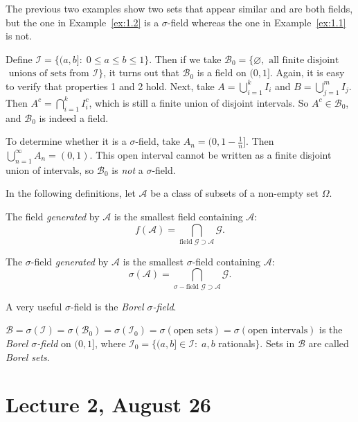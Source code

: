 \documentclass[11pt,fleqn]{book} %
\begin{document}
The previous two examples show two sets that appear similar and are both fields, but the one in Example~\ref{ex:1.2} is a $\sigma$-field whereas the one in Example~\ref{ex:1.1} is not.

\begin{example} \label{ex:1.3}
	Define $\mathcal{I} = \{(a,b]:\;0 \leq a \leq b \leq 1\}$. Then if we take $\mathcal{B}_0 = \{\varnothing, \textrm{ all finite disjoint}$ $\textrm{ unions of sets from } \mathcal{I}\}$, it turns out that $\mathcal{B}_0$ is a field on $(0,1]$. Again, it is easy to verify that properties 1 and 2 hold. Next, take $A = \bigcup_{i=1}^k I_i$ and $B = \bigcup_{j=1}^m I_j$. Then $A^c = \bigcap_{i=1}^k I_i^c$, which is still a finite union of disjoint intervals. So $A^c \in \mathcal{B}_0$, and $\mathcal{B}_0$ is indeed a field.

	To determine whether it is a $\sigma$-field, take $A_n = (0,1-\frac{1}{n}]$. Then $\bigcup_{n=1}^\infty A_n = (0,1)$. This open interval cannot be written as a finite disjoint union of intervals, so $\mathcal{B}_0$ is \emph{not} a $\sigma$-field.
\end{example}

In the following definitions, let $\mathcal{A}$ be a class of subsets of a non-empty set $\Omega$.

\begin{definition} \label{def:1.3}
	The field \emph{generated} by $\mathcal{A}$ is the smallest field containing $\mathcal{A}$:
	\[
		f(\mathcal{A}) = \bigcap_{\textrm{field } \mathcal{G} \supset \mathcal{A}} \mathcal{G}.
	\]

	The $\sigma$-field \emph{generated} by $\mathcal{A}$ is the smallest $\sigma$-field containing $\mathcal{A}$:
	\[
		\sigma(\mathcal{A}) = \bigcap_{\sigma-\textrm{field } \mathcal{G} \supset \mathcal{A}} \mathcal{G}.
	\]
\end{definition}

A very useful $\sigma$-field is the \emph{Borel $\sigma$-field}.

\begin{definition} \label{def:1.4}
	$\mathcal{B} = \sigma(\mathcal{I}) = \sigma(\mathcal{B}_0) = \sigma(\mathcal{I}_0) = \sigma(\textrm{open sets}) = \sigma(\textrm{open intervals})$ is the \emph{Borel $\sigma$-field} on $(0,1]$, where $\mathcal{I}_0 = \{(a,b] \in \mathcal{I}:\;a,b$ rationals$\}$. Sets in $\mathcal{B}$ are called \emph{Borel sets}.
\end{definition}

\section{Lecture 2, August 26}
\end{document}
